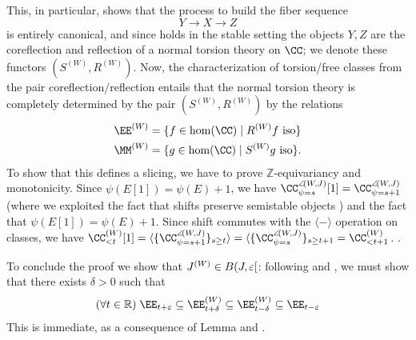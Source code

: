This, in particular, shows that the process to build the fiber sequence
\[
Y\to X\to Z
\]
is entirely canonical, and since \cite[\textbf{3.1}]{RT} holds in the stable setting the objects $Y,Z$ are the coreflection and reflection of a normal torsion theory on $\CC$; we denote these functors $(S^{(W)}, R^{(W)})$. Now, the characterization of torsion\fshyp{}free classes from the pair coreflection\fshyp{}reflection entails that the normal torsion theory is completely determined by the pair $(S^{(W)}, R^{(W)})$ by the relations
\begin{gather*}
\EE^{(W)} = \{f\in\hom(\CC)\mid R^{(W)}f \text{ iso}\} \\
\MM^{(W)} = \{g\in\hom(\CC)\mid S^{(W)}g \text{ iso}\}.
\end{gather*}
To show that this defines a slicing, we have to prove $\mathbb Z$-equivariancy and monotonicity. Since $\psi(E[1])=\psi(E)+1$, we have $\CC^{\semi(W,J)}_{\psi=s}[1]=\CC^{\semi(W,J)}_{\psi=s+1}$ (where we exploited the fact that shifts preserve semistable objects ) and the fact that $\psi(E[1])=\psi(E)+1$. Since shift commutes with the $\langle-\rangle$ operation on classes, we have $\CC^{(W)}_{< t}[1]=\langle \{\CC^{\semi(W,J)}_{\psi=s+1}\}_{s\geq t}\rangle=\langle \{\CC^{\semi(W,J)}_{\psi=s}\}_{s\geq t+1}=\CC^{(W)}_{< t+1}$. .

To conclude the proof we show that $J^{(W)}\in B(J, \varepsilon[$: following \adef {} and \aprop {}, we must show that there exists $\delta >0$ such that 
\[
(\forall t\in\R)\;\EE_{t+\eps} \subseteq \EE^{(W)}_{t+\delta} \subseteq \EE^{(W)}_{t-\delta} \subseteq \EE_{t-\eps}
\]
This is immediate, as a consequence of Lemma  and \acor {}.
